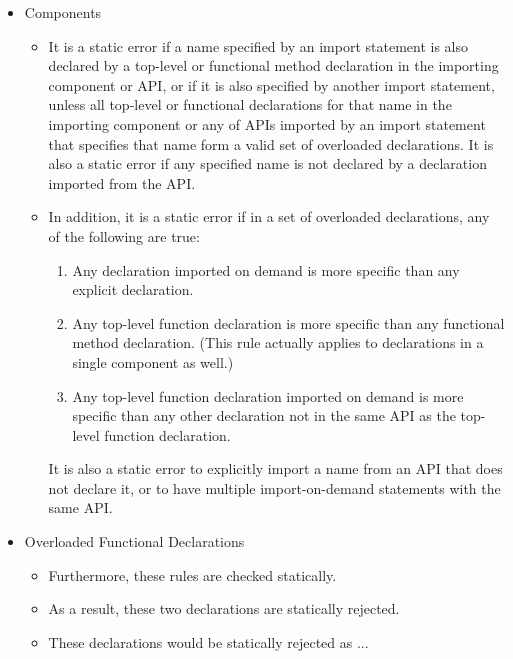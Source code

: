 \begin{itemize}
\begin{itemize}
\item %
 Components
 \begin{itemize}
\item
It is a static error if
a name specified by an import %
statement
is also declared by a top-level or functional method declaration
in the importing component or API,
or if it is also specified by another import %
statement,
unless all top-level or functional declarations for that name
in the importing component or any of APIs
imported by an import %
statement that specifies that name
form a valid set of overloaded declarations.
It is also a static error if any specified name
is not declared by a declaration imported from the API.
\item
In addition, it is a static error if in a set of overloaded declarations,
any of the following are true:
\begin{enumerate}
\item Any declaration imported on demand is more specific than any explicit declaration.
\item Any top-level function declaration is more specific than any functional method declaration.
(This rule actually applies to declarations in a single component as well.)
\item
Any top-level function declaration imported on demand is more specific than any other declaration not in the same API as the top-level function declaration.
\end{enumerate}
It is also a static error to explicitly import a name from an API
that does not declare it, or to have multiple import-on-demand statements
with the same API.

 \end{itemize}

\item {} Overloaded Functional Declarations
 \begin{itemize}
\item Furthermore, these rules are checked statically.
\item As a result, these two declarations are statically rejected.
\item These declarations would be statically rejected as ...
 \end{itemize}

 \end{itemize}


\end{itemize}
